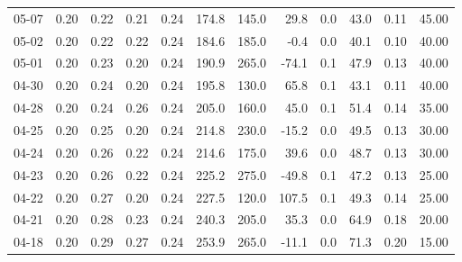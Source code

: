 \begin{threeparttable}
{\begin{tabular}{lrrrrrrrrrrr}
  05-07 &          0.20 &          0.22 &          0.21 &        0.24 &               174.8 &               145.0 &       29.8 &                 0.0 &             43.0 &            0.11 &                  45.00 \\
  05-02 &          0.20 &          0.22 &          0.22 &        0.24 &               184.6 &               185.0 &       -0.4 &                 0.0 &             40.1 &            0.10 &                  40.00 \\
  05-01 &          0.20 &          0.23 &          0.20 &        0.24 &               190.9 &               265.0 &      -74.1 &                 0.1 &             47.9 &            0.13 &                  40.00 \\
  04-30 &          0.20 &          0.24 &          0.20 &        0.24 &               195.8 &               130.0 &       65.8 &                 0.1 &             43.1 &            0.11 &                  40.00 \\
  04-28 &          0.20 &          0.24 &          0.26 &        0.24 &               205.0 &               160.0 &       45.0 &                 0.1 &             51.4 &            0.14 &                  35.00 \\
  04-25 &          0.20 &          0.25 &          0.20 &        0.24 &               214.8 &               230.0 &      -15.2 &                 0.0 &             49.5 &            0.13 &                  30.00 \\
  04-24 &          0.20 &          0.26 &          0.22 &        0.24 &               214.6 &               175.0 &       39.6 &                 0.0 &             48.7 &            0.13 &                  30.00 \\
  04-23 &          0.20 &          0.26 &          0.22 &        0.24 &               225.2 &               275.0 &      -49.8 &                 0.1 &             47.2 &            0.13 &                  25.00 \\
  04-22 &          0.20 &          0.27 &          0.20 &        0.24 &               227.5 &               120.0 &      107.5 &                 0.1 &             49.3 &            0.14 &                  25.00 \\
  04-21 &          0.20 &          0.28 &          0.23 &        0.24 &               240.3 &               205.0 &       35.3 &                 0.0 &             64.9 &            0.18 &                  20.00 \\
  04-18 &          0.20 &          0.29 &          0.27 &        0.24 &               253.9 &               265.0 &      -11.1 &                 0.0 &             71.3 &            0.20 &                  15.00 \\

\end{tabular}}
\end{threeparttable}
